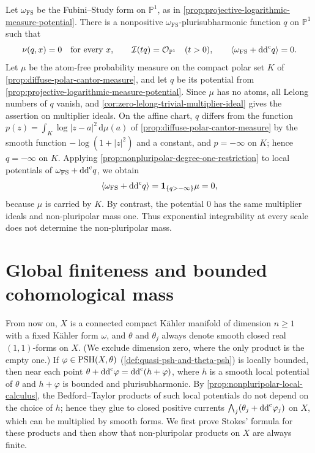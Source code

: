 \begin{example}\label{ex:diffuse-polar-zero-nonpluripolar-mass}
Let $\omega_{\mathrm{FS}}$ be the Fubini--Study form on $\mathbb P^1$, as in \cref{prop:projective-logarithmic-measure-potential}. There is a nonpositive $\omega_{\mathrm{FS}}$-plurisubharmonic function $q$ on $\mathbb P^1$ such that
\[
 \nu(q,x)=0\quad\text{for every }x,\qquad
 \mathcal I(tq)=\mathcal O_{\mathbb P^1}\quad(t>0),\qquad
 \langle\omega_{\mathrm{FS}}+\mathrm{dd}^{\mathrm{c}} q\rangle=0.
\]
Let $\mu$ be the atom-free probability measure on the compact polar set $K$ of \cref{prop:diffuse-polar-cantor-measure}, and let $q$ be its potential from \cref{prop:projective-logarithmic-measure-potential}. Since $\mu$ has no atoms, all Lelong numbers of $q$ vanish, and \cref{cor:zero-lelong-trivial-multiplier-ideal} gives the assertion on multiplier ideals. On the affine chart, $q$ differs from the function $p(z)=\int_K\log|z-a|^2\,\mathrm d\mu(a)$ of \cref{prop:diffuse-polar-cantor-measure} by the smooth function $-\log(1+|z|^2)$ and a constant, and $p=-\infty$ on $K$; hence $q=-\infty$ on $K$. Applying \cref{prop:nonpluripolar-degree-one-restriction} to local potentials of $\omega_{\mathrm{FS}}+\mathrm{dd}^{\mathrm{c}} q$, we obtain
\[
 \langle\omega_{\mathrm{FS}}+\mathrm{dd}^{\mathrm{c}} q\rangle
       =\mathbf1_{\{q>-\infty\}}\mu=0,
\]
because $\mu$ is carried by $K$. By contrast, the potential $0$ has the same multiplier ideals and non-pluripolar mass one. Thus exponential integrability at every scale does not determine the non-pluripolar mass.
\end{example}

\section{Global finiteness and bounded cohomological mass}
\label{sec:nonpluripolar-global-mass}
From now on, $X$ is a connected compact K\"ahler manifold of dimension $n\geq1$ with a fixed K\"ahler form $\omega$, and $\theta$ and $\theta_j$ always denote smooth closed real $(1,1)$-forms on $X$. (We exclude dimension zero, where the only product is the empty one.) If $\varphi\in\mathrm{PSH}(X,\theta)$ (\cref{def:quasi-psh-and-theta-psh}) is locally bounded, then near each point $\theta+\mathrm{dd}^{\mathrm{c}}\varphi=\mathrm{dd}^{\mathrm{c}}(h+\varphi)$, where $h$ is a smooth local potential of $\theta$ and $h+\varphi$ is bounded and plurisubharmonic. By \cref{prop:nonpluripolar-local-calculus}, the Bedford--Taylor products of such local potentials do not depend on the choice of $h$; hence they glue to closed positive currents $\bigwedge_j(\theta_j+\mathrm{dd}^{\mathrm{c}}\varphi_j)$ on $X$, which can be multiplied by smooth forms. We first prove Stokes' formula for these products and then show that non-pluripolar products on $X$ are always finite.

